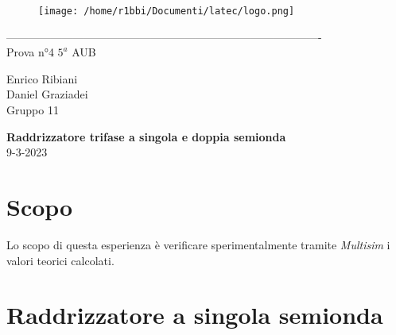 \documentclass[12pt]{article}
\begin{document}
    \begin{titlepage}
    \begin{center}
\begin{figure}
    \centering
    \texttt{[image: /home/r1bbi/Documenti/latec/logo.png]}
    
\end{figure}
-------------------------------------------------------------------------------------\\
\vspace{2\baselineskip}
\large Prova n°4
\hfill
\large $5^a$   AUB\\
\begin{flushleft}
    \large Enrico Ribiani\\
    \large Daniel Graziadei\\
    \large Gruppo 11\\
\end{flushleft}


\vfill

\Huge{\textbf{Raddrizzatore trifase a singola e doppia semionda }}\\
\vfill
\vfill
\large{9-3-2023}
\end{center}
\end{titlepage}
\thispagestyle{empty}
\tableofcontents
\newpage
\setcounter{page}{1}
\vskip 1cm
\section{Scopo}
Lo scopo di questa esperienza è verificare sperimentalmente tramite \textit{Multisim} i valori teorici calcolati.
\section{Raddrizzatore a singola semionda}
\end{document}

